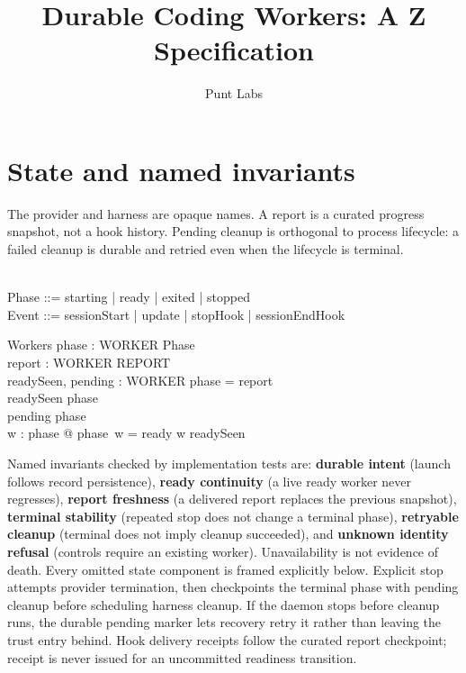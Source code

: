 \documentclass[a4paper,10pt,fleqn]{article}
\begin{document}
\title{Durable Coding Workers: A Z Specification}
\author{Punt Labs}
\maketitle

\section{State and named invariants}

The provider and harness are opaque names. A report is a curated progress
snapshot, not a hook history. Pending cleanup is orthogonal to process lifecycle:
a failed cleanup is durable and retried even when the lifecycle is terminal.

\begin{zed}
   \\
  Phase ::= starting | ready | exited | stopped \\
  Event ::= sessionStart | update | stopHook | sessionEndHook
\end{zed}

\begin{schema}{Workers}
  phase : WORKER \pfun Phase \\
  report : WORKER \pfun REPORT \\
  readySeen, pending : \power WORKER
\where
  \dom phase = \dom report \\
  readySeen \subseteq \dom phase \\
  pending \subseteq \dom phase \\
  \forall w : \dom phase @ phase~w = ready \implies w \in readySeen
\end{schema}

Named invariants checked by implementation tests are:
\textbf{durable intent} (launch follows record persistence),
\textbf{ready continuity} (a live ready worker never regresses),
\textbf{report freshness} (a delivered report replaces the previous snapshot),
\textbf{terminal stability} (repeated stop does not change a terminal phase),
\textbf{retryable cleanup} (terminal does not imply cleanup succeeded), and
\textbf{unknown identity refusal} (controls require an existing worker).
Unavailability is not evidence of death. Every omitted state component is framed
explicitly below. Explicit stop attempts provider termination, then checkpoints
the terminal phase with pending cleanup before scheduling harness cleanup.
If the daemon stops before cleanup runs, the durable pending marker lets
recovery retry it rather than leaving the trust entry behind.
Hook delivery receipts follow the curated report checkpoint; receipt is never
issued for an uncommitted readiness transition.
\end{document}
